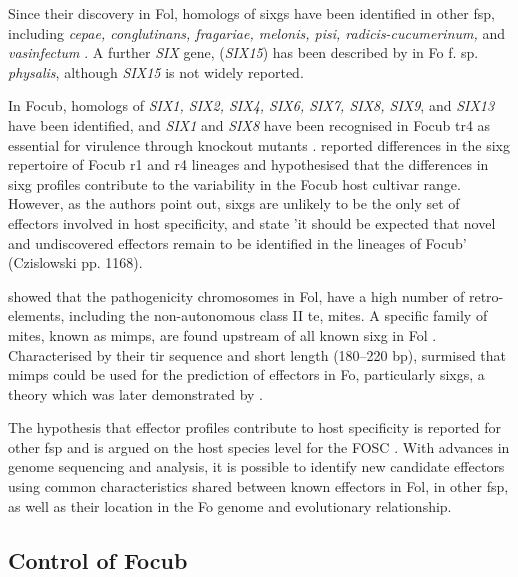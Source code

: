 Since their discovery in \ac{Fol}, homologs of \acp{sixg} have been identified in other \ac{fsp}, including \textit{cepae, conglutinans, fragariae, melonis, pisi, radicis-cucumerinum,} and \textit{vasinfectum} \parencite{Czislowski2018}. A further \textit{SIX} gene, (\textit{SIX15}) has been described by \parencite{Simbaqueba2018} in \acl{Fo} f. sp. \textit{physalis}, although \textit{SIX15} is not widely reported. 

In \ac{Focub}, homologs of \textit{SIX1, SIX2, SIX4, SIX6, SIX7, SIX8, SIX9}, and \textit{SIX13} have been identified, and \textit{SIX1} and \textit{SIX8} have been recognised in \ac{Focub} \ac{tr4} as essential for virulence through knockout mutants \parencite{ Widinugraheni2018, An2019}. \textcite{Czislowski2018} reported differences in the \ac{sixg} repertoire of \ac{Focub} \ac{r1} and \ac{r4} lineages and hypothesised that the differences in \ac{sixg} profiles contribute to the variability in the \ac{Focub} host cultivar range.  However, as the authors point out, \acp{sixg} are unlikely to be the only set of effectors involved in host specificity, and state 'it should be expected that novel and undiscovered effectors remain to be identified in the lineages of \ac{Focub}' (Czislowski  pp. 1168).  

\textcite{Ma2010} showed that the pathogenicity chromosomes in \ac{Fol}, have a high number of retro-elements, including the non-autonomous class II \ac{te}, \ac{mites}. A specific family of \ac{mites}, known as \acp{mimp}, are found upstream of all known \ac{sixg} in \ac{Fol} \parencite{Schmidt2013}. Characterised by their \ac{tir} sequence and short length (180–220 \acs{bp}), \textcite{Schmidt2013} surmised that \acp{mimp} could be used for the prediction of effectors in \ac{Fo}, particularly \acp{sixg}, a theory which was later demonstrated by \textcite{Dam2016, Dam2017, Armitage2018, FoEC2}.  

The hypothesis that effector profiles contribute to host specificity is reported for other \ac{fsp} \parencite{Achari2021, Batson2021} and is argued on the host species level for the \ac{FOSC} \parencite{Dam2016}. With advances in genome sequencing and analysis, it is possible to identify new candidate effectors using common characteristics shared between known effectors in \ac{Fol}, in other \ac{fsp}, as well as their location in the \ac{Fo} genome and evolutionary relationship.

\subsection{Control of \acl{Focub}}

